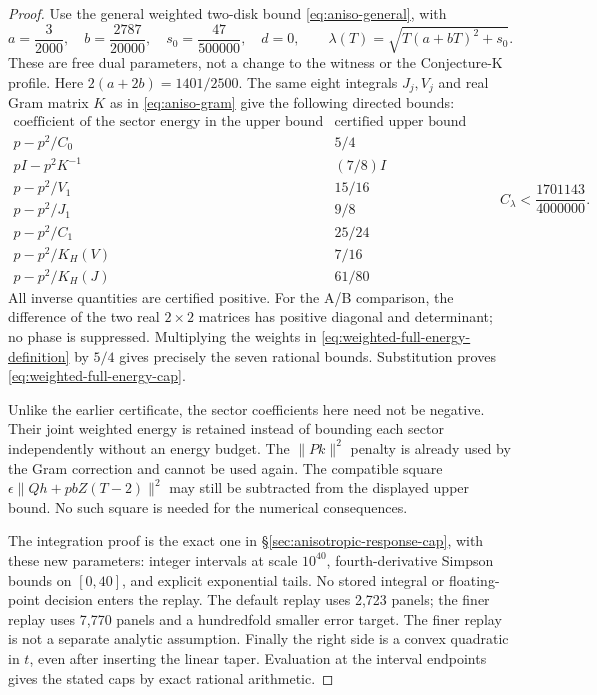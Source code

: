 \begin{proof}
Use the general weighted two-disk bound \eqref{eq:aniso-general}, with
\[
 a=\frac3{2000},\quad b=\frac{2787}{20000},\quad
 s_0=\frac{47}{500000},\quad d=0,\qquad
 \lambda(T)=\sqrt{T(a+bT)^2+s_0}.
\]
These are free dual parameters, not a change to the witness or the
Conjecture-K profile. Here $2(a+2b)=1401/2500$.
The same eight integrals $J_j,V_j$ and real Gram matrix $K$ as in
\eqref{eq:aniso-gram} give the following directed bounds:
\[
\begin{array}{c|c}
 \text{coefficient of the sector energy in the upper bound}
      &\text{certified upper bound}\\\hline
 p-p^2/C_0&5/4\\
 pI-p^2K^{-1}&(7/8)I\\
 p-p^2/V_1&15/16\\
 p-p^2/J_1&9/8\\
 p-p^2/C_1&25/24\\
 p-p^2/K_H(V)&7/16\\
 p-p^2/K_H(J)&61/80
\end{array}
\qquad
 C_\lambda<\frac{1701143}{4000000}.
\]
All inverse quantities are certified positive. For the A/B comparison,
the difference of the two real $2\times2$ matrices has positive diagonal
and determinant; no phase is suppressed. Multiplying the weights in
\eqref{eq:weighted-full-energy-definition} by $5/4$ gives precisely
the seven rational bounds. Substitution proves
\eqref{eq:weighted-full-energy-cap}.

Unlike the earlier certificate, the sector coefficients here need not be
negative. Their joint weighted energy is retained instead of bounding
each sector independently without an energy budget. The $\|Pk\|^2$
penalty is already used by the Gram correction and cannot be used again.
The compatible square
$\epsilon\|Qh+pbZ(T-2)\|^2$ may still be subtracted from the displayed
upper bound. No such square is needed for the numerical consequences.

The integration proof is the exact one in
\S\ref{sec:anisotropic-response-cap}, with these new parameters:
integer intervals at scale $10^{40}$, fourth-derivative Simpson bounds
on $[0,40]$, and explicit exponential tails. No stored integral or
floating-point decision enters the replay. The default replay uses
2,723 panels; the finer replay uses 7,770 panels and a hundredfold smaller
error target. The finer replay is not a separate analytic assumption.
Finally the right side is a convex quadratic in $t$, even after inserting
the linear taper. Evaluation at the interval endpoints gives the stated
caps by exact rational arithmetic.
\end{proof}

